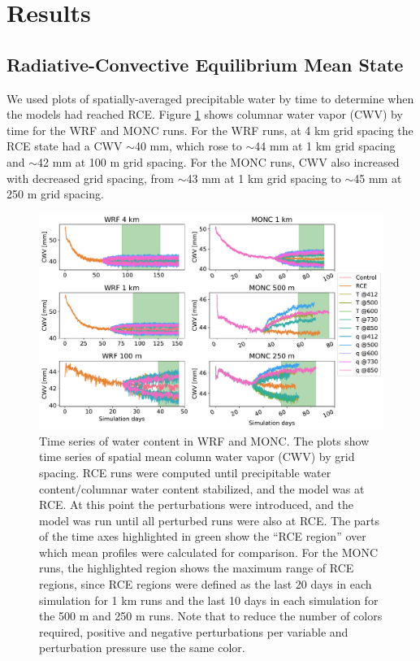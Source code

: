 \documentclass[draft]{agujournal2019}
\begin{document}
\section{Results}
\label{sec:results}

\subsection{Radiative-Convective Equilibrium Mean State}

We used plots of spatially-averaged precipitable water by time to determine when
the models had reached RCE. Figure \ref{fig:rce_pw} shows columnar water vapor
(CWV) by time for the WRF and MONC runs. For the WRF runs, at 4 km grid spacing
the RCE state had a CWV $\sim$40 mm, which rose to $\sim$44 mm at 1 km grid
spacing and $\sim$42 mm at 100 m grid spacing. For the MONC runs, CWV also
increased with decreased grid spacing, from $\sim$43 mm at 1 km grid spacing to
$\sim$45 mm at 250 m grid spacing.

\begin{figure}[pth]
    \noindent\includegraphics[width=\textwidth]{figures/runs_timeseries.pdf}
    \caption{Time series of water content in WRF and MONC. The plots show time
    series of spatial mean column water vapor (CWV) by grid spacing. RCE runs
    were computed until precipitable water content/columnar water content
    stabilized, and the model was at RCE. At this point the perturbations were
    introduced, and the model was run until all perturbed runs were also at RCE.
    The parts of the time axes highlighted in green show the ``RCE region'' over
    which mean profiles were calculated for comparison. For the MONC runs, the
    highlighted region shows the maximum range of RCE regions, since RCE regions
    were defined as the last 20 days in each simulation for 1 km runs and the
    last 10 days in each simulation for the 500 m and 250 m runs. Note that to
    reduce the number of colors required, positive and negative perturbations
    per variable and perturbation pressure use the same color.}
    \label{fig:rce_pw}
\end{figure}
\end{document}

